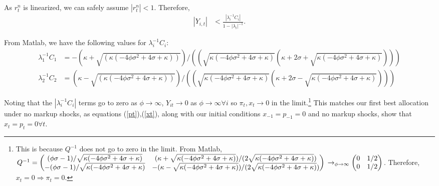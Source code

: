 \documentclass[11pt]{article} %
\begin{document}
As $r_t^n$ is linearized, we can safely assume $|r_t^n|<1$. Therefore,
\begin{align*}
|Y_{i,t}| &< \frac{|\lambda_i^{-1}C_i|}{1-|\lambda_i|^{-1}}.
\end{align*}

From Matlab, we have the following values for $\lambda_i^{-1}C_i$:
\begin{align*}
\lambda_1^{-1}C_1 &= -(\kappa + \sqrt{(\kappa (-4\phi\sigma^2 + 4\sigma + \kappa))})/((\sqrt{\kappa(-4\phi\sigma^2 + 4\sigma +\kappa)}(\kappa + 2\sigma + \sqrt{\kappa(-4\phi\sigma^2 +4\sigma + \kappa)}))) \\
\lambda_2^{-1}C_2 &= (\kappa - \sqrt{(\kappa (-4\phi\sigma^2 + 4\sigma + \kappa))})/((\sqrt{\kappa(-4\phi\sigma^2 + 4\sigma +\kappa)}(\kappa + 2\sigma - \sqrt{\kappa(-4\phi\sigma^2 +4\sigma + \kappa)})))
\end{align*}


Noting that the $|\lambda_i^{-1}C_i|$ terms go to zero as $\phi \rightarrow \infty$, $Y_{it}\rightarrow 0$ as $\phi \rightarrow \infty \forall i$ so $\pi_t,x_t \rightarrow 0$ in the limit.\footnote{This is because $Q^{-1}$ does not go to zero in the limit. From Matlab,\\ $Q^{-1} = \begin{pmatrix}(\phi\sigma - 1)/\sqrt{\kappa(-4\phi\sigma^2 + 4\sigma + \kappa)} & (\kappa + \sqrt{\kappa(-4\phi\sigma^2 + 4\sigma + \kappa)})/(2\sqrt{\kappa(-4\phi\sigma^2 + 4\sigma + \kappa)}) \\ -(\phi\sigma - 1)/\sqrt{\kappa(-4\phi\sigma^2 + 4\sigma + \kappa)} & -(\kappa - \sqrt{\kappa(-4\phi\sigma^2 + 4\sigma + \kappa)})/(2\sqrt{\kappa(-4\phi\sigma^2 + 4\sigma + \kappa)}) \end{pmatrix}\\ \rightarrow_{\phi\rightarrow\infty} \begin{pmatrix}0 &1/2 \\0 & 1/2  \end{pmatrix}$. Therefore, $x_t = 0 \Rightarrow \pi_t = 0.$} This matches our first best allocation under no markup shocks, as equations (\ref{pt}),(\ref{xt}), along with our initial conditions $x_{-1} = p_{-1} = 0$ and no markup shocks, show that $x_t = p_t = 0 \forall t$.
\end{document}
